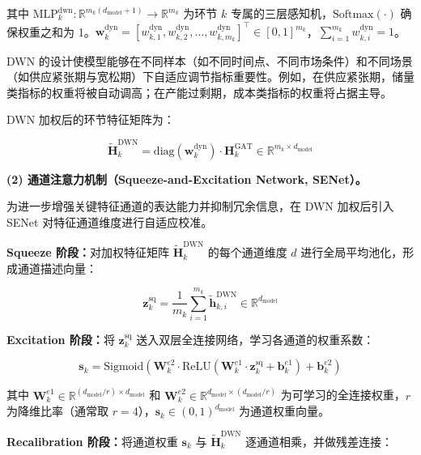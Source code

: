 其中 $\text{MLP}_k^{\text{dwn}}:\mathbb{R}^{m_k(d_{\text{model}}+1)}\to\mathbb{R}^{m_k}$ 为环节 $k$ 专属的三层感知机，$\text{Softmax}(\cdot)$ 确保权重之和为 1。$\mathbf{w}_k^{\text{dyn}}=[w_{k,1}^{\text{dyn}},w_{k,2}^{\text{dyn}},\ldots,w_{k,m_k}^{\text{dyn}}]^{\top}\in[0,1]^{m_k}$，$\sum_{i=1}^{m_k} w_{k,i}^{\text{dyn}}=1$。

DWN 的设计使模型能够在不同样本（如不同时间点、不同市场条件）和不同场景（如供应紧张期与宽松期）下自适应调节指标重要性。例如，在供应紧张期，储量类指标的权重将被自动调高；在产能过剩期，成本类指标的权重将占据主导。

DWN 加权后的环节特征矩阵为：

\begin{equation}
\tilde{\mathbf{H}}_k^{\text{DWN}} = \text{diag}(\mathbf{w}_k^{\text{dyn}}) \cdot \mathbf{H}_k^{\text{GAT}} \in \mathbb{R}^{m_k\times d_{\text{model}}}
\end{equation}

\textbf{(2) 通道注意力机制（Squeeze-and-Excitation Network, SENet）。}

为进一步增强关键特征通道的表达能力并抑制冗余信息，在 DWN 加权后引入 SENet 对特征通道维度进行自适应校准。

\textbf{Squeeze 阶段：}对加权特征矩阵 $\tilde{\mathbf{H}}_k^{\text{DWN}}$ 的每个通道维度 $d$ 进行全局平均池化，形成通道描述向量：

\begin{equation}
\mathbf{z}_k^{\text{sq}} = \frac{1}{m_k} \sum_{i=1}^{m_k} \tilde{\mathbf{h}}_{k,i}^{\text{DWN}} \in \mathbb{R}^{d_{\text{model}}}
\end{equation}

\textbf{Excitation 阶段：}将 $\mathbf{z}_k^{\text{sq}}$ 送入双层全连接网络，学习各通道的权重系数：

\begin{equation}
\mathbf{s}_k = \text{Sigmoid}\left(\mathbf{W}_k^{e2}\cdot\text{ReLU}\left(\mathbf{W}_k^{e1}\cdot\mathbf{z}_k^{\text{sq}} + \mathbf{b}_k^{e1}\right) + \mathbf{b}_k^{e2}\right)
\end{equation}

其中 $\mathbf{W}_k^{e1}\in\mathbb{R}^{(d_{\text{model}}/r)\times d_{\text{model}}}$ 和 $\mathbf{W}_k^{e2}\in\mathbb{R}^{d_{\text{model}}\times(d_{\text{model}}/r)}$ 为可学习的全连接权重，$r$ 为降维比率（通常取 $r=4$），$\mathbf{s}_k\in(0,1)^{d_{\text{model}}}$ 为通道权重向量。

\textbf{Recalibration 阶段：}将通道权重 $\mathbf{s}_k$ 与 $\tilde{\mathbf{H}}_k^{\text{DWN}}$ 逐通道相乘，并做残差连接：

